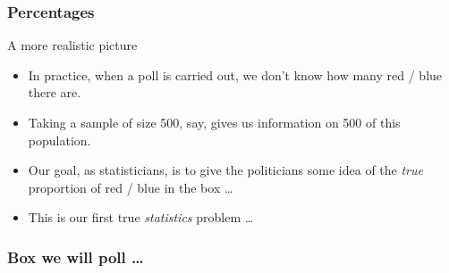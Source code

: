 \documentclass[handout]{beamer}
\begin{document}

   \begin{frame} \frametitle{Percentages}

   \begin{block}
   {A more realistic picture}
   \begin{itemize}
   \item In practice, when a poll is carried out, we don't know
   how many {\color{red} red} / {\color{blue} blue} there are.

   \item Taking a sample of size 500, say, gives us
   information on 500 of this population.

   \item Our goal, as statisticians, is to give the politicians
   some idea of the {\em true} proportion of {\color{red} red} / {\color{blue} blue} in the box \dots

   \item This is our first true {\em statistics} problem \dots

   \end{itemize}
   \end{block}
   \end{frame}



   \begin{frame}
   \frametitle{Box we will poll \dots}
   \begin{center}
   \end{center}

   \end{frame}
\end{document}
